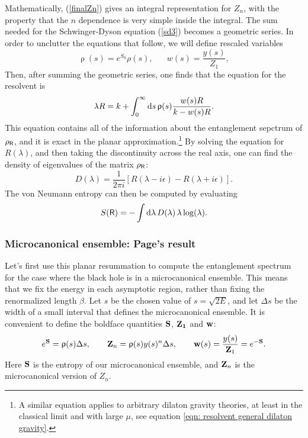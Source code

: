 \documentclass[12pt]{article}
\newcommand{\be}{\begin{equation}}
\newcommand{\ee}{\end{equation}}
\numberwithin{equation}{section}
\begin{document}
Mathematically, (\ref{finalZn}) gives an integral representation for $Z_n$, with the property that the $n$ dependence is very simple inside the integral. The sum needed for the Schwinger-Dyson equation (\ref{sd3}) becomes a geometric series. In order to unclutter the equations that follow, we will define rescaled variables
\be
\uprho(s) = e^{S_0}\rho(s), \hspace{20pt} w(s) = \frac{y(s)}{Z_1},\label{rescaledvariables}
\ee 
Then, after summing the geometric series, one finds that the equation for the resolvent is
\be
\lambda R=k+\int_0^\infty \mathrm{d}s\, \uprho(s) {w(s)R\over k- w(s)R}.
\label{eqn: resolvent eqn}
\ee
This equation contains all of the information about the entanglement sepctrum of $\rho_{\sf{R}}$, and it is exact in the planar approximation.\footnote{A similar equation applies to arbitrary dilaton gravity theories, at least in the classical limit and with large $\mu$, see equation \ref{eqn: resolvent general dilaton gravity}.} By solving the equation for $R(\lambda)$, and then taking the discontinuity across the real axis, one can find the density of eigenvalues of the matrix $\rho_{\sf{R}}$:
\be
D(\lambda) = \frac{1}{2\pi i}\left[R(\lambda-i\epsilon) - R(\lambda+i\epsilon)\right].\label{dos}
\ee
The von Neumann entropy can then be computed by evaluating
\be
S({\sf{R}}) = -\int \mathrm{d}\lambda\, D(\lambda)\, \lambda \log(\lambda).\label{vnEnt}
\ee



\subsubsection{Microcanonical ensemble: Page's result}
Let's first use this planar resummation to compute the entanglement spectrum for the case where the black hole is in a microcanonical ensemble. This means that we fix the energy in each asymptotic region, rather than fixing the renormalized length $\beta$. Let $s$ be the chosen value of $s = \sqrt{2E}$, and let $\Delta s$ be the width of a small interval that defines the microcanonical ensemble. It is convenient to define the boldface quantities ${\bf S}$, ${\bf{Z}_1}$ and ${\bf w}$:
\be
e^{\bf S} = \uprho(s) \Delta s, \hspace{20pt} {\bf Z}_n = \uprho(s)y(s)^n\Delta s, \hspace{20pt} {\bf w}(s) = \frac{y(s)}{{\bf Z}_1} = e^{-{\bf S}}.
\ee
Here ${\bf S}$ is the entropy of our microcanonical ensemble, and ${\bf Z}_n$ is the microcanonical version of $Z_n$.
\end{document}
